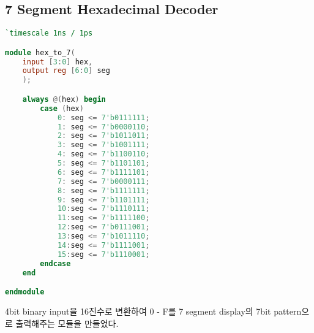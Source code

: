 \documentclass[10pt]{article}
\begin{document}
    \subsection{7 Segment Hexadecimal Decoder}
    \begin{lstlisting}[language=Verilog, caption=hex\_to\_7.v]
`timescale 1ns / 1ps

module hex_to_7(
    input [3:0] hex,
    output reg [6:0] seg
    );

	always @(hex) begin
        case (hex)
            0: seg <= 7'b0111111;
            1: seg <= 7'b0000110;
            2: seg <= 7'b1011011;
            3: seg <= 7'b1001111;
            4: seg <= 7'b1100110;
            5: seg <= 7'b1101101;
            6: seg <= 7'b1111101;
            7: seg <= 7'b0000111;
            8: seg <= 7'b1111111;
            9: seg <= 7'b1101111;
            10:seg <= 7'b1110111;
            11:seg <= 7'b1111100;
            12:seg <= 7'b0111001;
            13:seg <= 7'b1011110;
            14:seg <= 7'b1111001;
            15:seg <= 7'b1110001;
        endcase
    end

endmodule
    \end{lstlisting}

    4bit binary input을 16진수로 변환하여 0 - F를 7 segment display의 7bit pattern으로 출력해주는 모듈을 만들었다.
\end{document}
